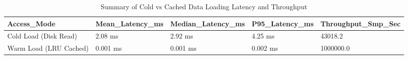 \begin{table}
\caption{Summary of Cold vs Cached Data Loading Latency and Throughput}
\label{tab:table_loading_performance}
\begin{tabular}{lllll}
\toprule
Access\_Mode & Mean\_Latency\_ms & Median\_Latency\_ms & P95\_Latency\_ms & Throughput\_Smp\_Sec \\
\midrule
Cold Load (Disk Read) & 2.08 ms & 2.92 ms & 4.25 ms & 43018.2 \\
Warm Load (LRU Cached) & 0.001 ms & 0.001 ms & 0.002 ms & 1000000.0 \\
\bottomrule
\end{tabular}
\end{table}
